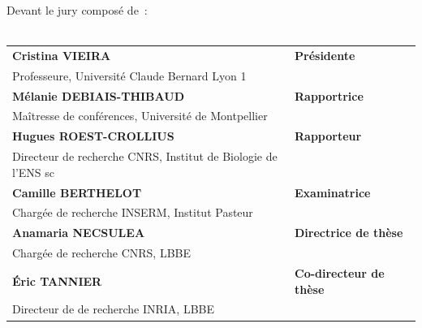 \large{Devant le jury composé de~:\\\\}
\small {
\renewcommand{\arraystretch}{1.2}
\begin{tabular}{ll}
    \textbf{Cristina VIEIRA} &  \textbf{Présidente}         \\
    Professeure, Université Claude Bernard Lyon 1 \\
    
    \textbf{Mélanie DEBIAIS-THIBAUD} & \textbf{Rapportrice}         \\
    Maîtresse de conférences, Université de Montpellier \\
    
    \textbf{Hugues ROEST-CROLLIUS} & \textbf{Rapporteur}         \\
    Directeur de recherche CNRS, Institut de Biologie de l'ENS            sc \\
    
    \textbf{Camille BERTHELOT}  & \textbf{Examinatrice}        \\
    Chargée de recherche INSERM, Institut Pasteur \\
    
    \textbf{Anamaria NECSULEA}       & \textbf{Directrice de thèse} \\
    Chargée de recherche CNRS, LBBE \\
    
    \textbf{Éric TANNIER}       & \textbf{Co-directeur de thèse} \\
    Directeur de de recherche INRIA, LBBE \\
\end{tabular}
}
